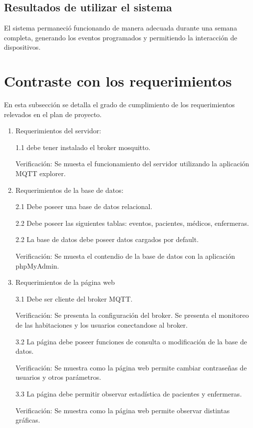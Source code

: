 \subsection{Resultados de utilizar el sistema}
\label{Resultados de utilizar el sistema}
El sistema permaneció funcionando de manera adecuada durante una semana completa, generando los eventos programados y permitiendo la interacción de dispositivos.
\pagebreak
\section{Contraste con los requerimientos}
\label{Contraste con los requerimientos}

En esta subsección se detalla el grado de cumplimiento de los requerimientos relevados en el plan de proyecto.
\begin{enumerate}
\item Requerimientos del servidor: 

1.1 debe tener instalado el broker mosquitto.

Verificación: Se muesta el funcionamiento del servidor utilizando la aplicación MQTT explorer.

\item Requerimientos de la base de datos: 

2.1 Debe poseer una base de datos relacional. 

2.2 Debe poseer las siguientes tablas: eventos, pacientes, médicos, enfermeras. 

2.2 La base de datos debe poseer datos cargados por default.

Verificación: Se muesta el contendio de la base de datos con la aplicación phpMyAdmin.

\item Requerimientos de la página web 

3.1 Debe ser cliente del broker MQTT. 

Verificación: Se presenta la configuración del broker. Se presenta el monitoreo de las habitaciones y los usuarios conectandose al broker.

3.2 La página debe poseer funciones de consulta o modificación de la base de datos.

Verificación: Se muestra como la página web permite cambiar contraseñas de usuarios y otros parámetros.

3.3 La página debe permitir observar estadística de pacientes y enfermeras.

Verificación: Se muestra como la página web permite observar distintas gráficas.


\end{enumerate}
